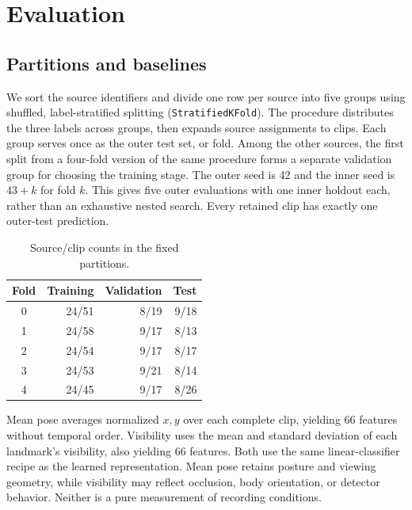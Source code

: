 \documentclass[10pt,twocolumn,letterpaper]{article}
\begin{document}
\section{Evaluation}
\subsection{Partitions and baselines}
We sort the source identifiers and divide one row per source into five groups using shuffled, label-stratified splitting (\texttt{StratifiedKFold}). The procedure distributes the three labels across groups, then expands source assignments to clips. Each group serves once as the outer test set, or fold. Among the other sources, the first split from a four-fold version of the same procedure forms a separate validation group for choosing the training stage. The outer seed is 42 and the inner seed is $43+k$ for fold $k$. This gives five outer evaluations with one inner holdout each, rather than an exhaustive nested search. Every retained clip has exactly one outer-test prediction.

\begin{table}[t]
\centering
\caption{Source/clip counts in the fixed partitions.}
\label{tab:splits}
\begin{tabular}{crrr}
\toprule
Fold & Training & Validation & Test\\
\midrule
0&24/51&8/19&9/18\\
1&24/58&9/17&8/13\\
2&24/54&9/17&8/17\\
3&24/53&9/21&8/14\\
4&24/45&9/17&8/26\\
\bottomrule
\end{tabular}
\end{table}

Mean pose averages normalized $x,y$ over each complete clip, yielding 66 features without temporal order. Visibility uses the mean and standard deviation of each landmark's visibility, also yielding 66 features. Both use the same linear-classifier recipe as the learned representation. Mean pose retains posture and viewing geometry, while visibility may reflect occlusion, body orientation, or detector behavior. Neither is a pure measurement of recording conditions.
\end{document}
